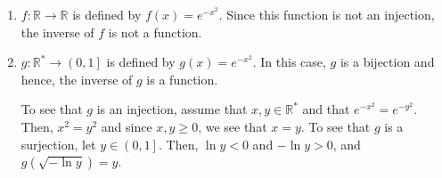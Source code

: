 \begin{list}{\bf{\ref{exer:sec65-6}.}}
\item \begin{enumerate}
\item $f:\mathbb{R} \to \mathbb{R}$ is defined by $f\left( x \right) = e^{ - x^2 } $.  Since this function is not an injection, the inverse of $f$ is not a function.

\item $g:\mathbb{R}^*  \to \left( {0, 1} \right]$ is defined by $g\left( x \right) = e^{ - x^2 }$.  In this case, $g$ is a bijection and hence, the inverse of $g$ is a function.

To see that $g$ is an injection, assume that $x, y \in \mathbb{R}^*$ and that 
$e^{-x^2} = e^{-y^2}$.  Then, $x^2 = y^2$ and since $x, y \geq 0$, we see that $x = y$.  To see that $g$ is a surjection, let $y \in \left( 0, 1 \right]$.  Then, $\ln y < 0$ and $- \ln y > 0$, and $g \left( \sqrt{-\ln y} \right) = y$.
\end{enumerate}
\end{list}

\hbreak


\endinput


